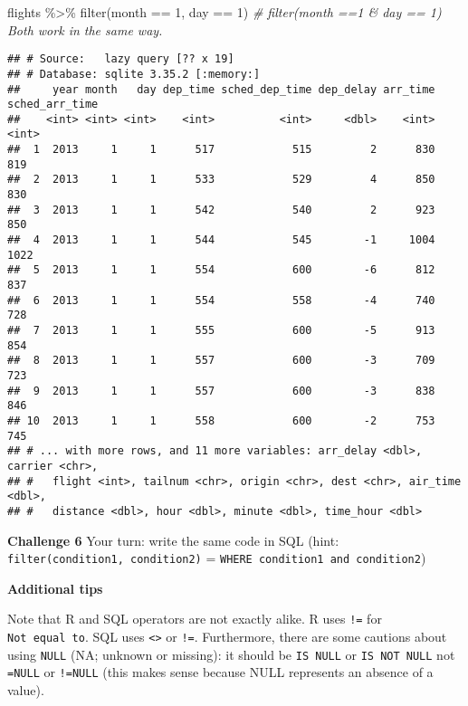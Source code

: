 \documentclass[
]{book}
\newenvironment{Shaded}{\begin{snugshade}}{\end{snugshade}}
\newcommand{\CommentTok}[1]{\textcolor[rgb]{0.56,0.35,0.01}{\textit{#1}}}
\newcommand{\DecValTok}[1]{\textcolor[rgb]{0.00,0.00,0.81}{#1}}
\newcommand{\FunctionTok}[1]{\textcolor[rgb]{0.00,0.00,0.00}{#1}}
\newcommand{\NormalTok}[1]{#1}
\newcommand{\SpecialCharTok}[1]{\textcolor[rgb]{0.00,0.00,0.00}{#1}}
\begin{document}
\begin{Shaded}
\begin{Highlighting}[]
\NormalTok{flights }\SpecialCharTok{\%\textgreater{}\%} 
  \FunctionTok{filter}\NormalTok{(month }\SpecialCharTok{==} \DecValTok{1}\NormalTok{, day }\SpecialCharTok{==} \DecValTok{1}\NormalTok{) }\CommentTok{\# filter(month ==1 \& day == 1) Both work in the same way.}
\end{Highlighting}
\end{Shaded}

\begin{verbatim}
## # Source:   lazy query [?? x 19]
## # Database: sqlite 3.35.2 [:memory:]
##     year month   day dep_time sched_dep_time dep_delay arr_time sched_arr_time
##    <int> <int> <int>    <int>          <int>     <dbl>    <int>          <int>
##  1  2013     1     1      517            515         2      830            819
##  2  2013     1     1      533            529         4      850            830
##  3  2013     1     1      542            540         2      923            850
##  4  2013     1     1      544            545        -1     1004           1022
##  5  2013     1     1      554            600        -6      812            837
##  6  2013     1     1      554            558        -4      740            728
##  7  2013     1     1      555            600        -5      913            854
##  8  2013     1     1      557            600        -3      709            723
##  9  2013     1     1      557            600        -3      838            846
## 10  2013     1     1      558            600        -2      753            745
## # ... with more rows, and 11 more variables: arr_delay <dbl>, carrier <chr>,
## #   flight <int>, tailnum <chr>, origin <chr>, dest <chr>, air_time <dbl>,
## #   distance <dbl>, hour <dbl>, minute <dbl>, time_hour <dbl>
\end{verbatim}

\textbf{Challenge 6}
Your turn: write the same code in SQL (hint: \texttt{filter(condition1,\ condition2)} = \texttt{WHERE\ condition1\ and\ condition2})

\textbf{Additional tips}

Note that R and SQL operators are not exactly alike. R uses \texttt{!=} for \texttt{Not\ equal\ to}. SQL uses \texttt{\textless{}\textgreater{}} or \texttt{!=}. Furthermore, there are some cautions about using \texttt{NULL} (NA; unknown or missing): it should be \texttt{IS\ NULL} or \texttt{IS\ NOT\ NULL} not \texttt{=NULL} or \texttt{!=NULL} (this makes sense because NULL represents an absence of a value).
\end{document}
